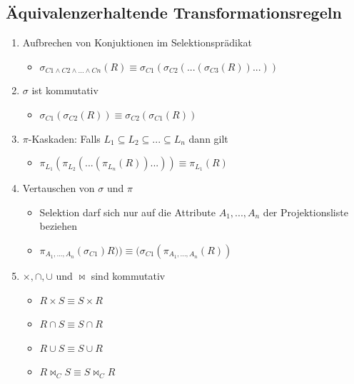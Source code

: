 \documentclass[a4paper]{article}
\begin{document}
    \subsection{Äquivalenzerhaltende Transformationsregeln}
    \begin{enumerate}
        \item Aufbrechen von Konjuktionen im Selektionsprädikat
        \begin{itemize}
            \item $\sigma_{C1 \wedge C2 \wedge ... \wedge Cn}(R) \equiv \sigma_{C1} ( \sigma_{C2} (... (\sigma_{C3}(R))...))$
        \end{itemize}
        
        \item $\sigma$ ist kommutativ
        \begin{itemize}
            \item $\sigma_{C1}(\sigma_{C2}(R)) \equiv \sigma_{C2}(\sigma_{C1}(R))$
        \end{itemize}
        
        \item $\pi$-Kaskaden: Falls $L_1 \subseteq L_2 \subseteq ... \subseteq L_n$ dann gilt
        \begin{itemize}
            \item $\pi_{L_1} ( \pi_{L_2} ( ... (\pi_{L_n}(R)) ... )) \equiv \pi_{L_1} (R) $
        \end{itemize}
        
        \item Vertauschen von $\sigma$ und $\pi$
        \begin{itemize}
            \item Selektion darf sich nur auf die Attribute $A_1, ... , A_n$ der Projektionsliste beziehen
            \item $\pi_{A_1, ... , A_n} (\sigma_{C1})R)) \equiv (\sigma_{C1}(\pi_{A_1, ... , A_n}(R))$
        \end{itemize}
        
        \item $\times, \cap , \cup$ und $\bowtie$ sind kommutativ
        \begin{itemize}
            \item $R \times S \equiv S \times R$
            \item $R \cap S \equiv S \cap R$
            \item $R \cup S \equiv S \cup R$
            \item $R \bowtie_C S \equiv S \bowtie_C R$
        \end{itemize}
        

\end{enumerate}
\end{document}
